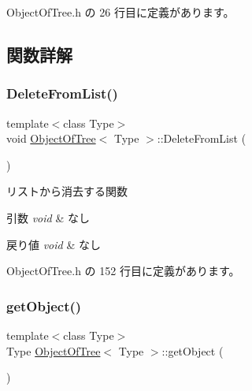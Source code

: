  Object\+Of\+Tree.\+h の 26 行目に定義があります。



\subsection{関数詳解}
\mbox{\label{class_object_of_tree_a1356595b29749ca4555ca61a5bb30388}} 
\subsubsection{\texorpdfstring{Delete\+From\+List()}{DeleteFromList()}}
{\footnotesize\ttfamily template$<$class Type$>$ \\
void \mbox{\hyperlink{class_object_of_tree}{Object\+Of\+Tree}}$<$ Type $>$\+::Delete\+From\+List (\begin{DoxyParamCaption}{ }\end{DoxyParamCaption})\hspace{0.3cm}{\ttfamily [inline]}}



リストから消去する関数 


\begin{DoxyParams}{引数}
{\em void} & なし \\
\hline
\end{DoxyParams}

\begin{DoxyRetVals}{戻り値}
{\em void} & なし \\
\hline
\end{DoxyRetVals}


 Object\+Of\+Tree.\+h の 152 行目に定義があります。

\mbox{\label{class_object_of_tree_a28214e15fffb72cb50b764e2f3ac863d}} 
\subsubsection{\texorpdfstring{get\+Object()}{getObject()}}
{\footnotesize\ttfamily template$<$class Type$>$ \\
Type \mbox{\hyperlink{class_object_of_tree}{Object\+Of\+Tree}}$<$ Type $>$\+::get\+Object (\begin{DoxyParamCaption}{ }\end{DoxyParamCaption})\hspace{0.3cm}{\ttfamily [inline]}}



